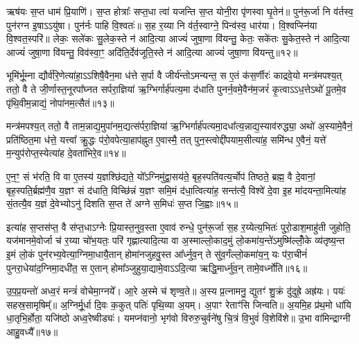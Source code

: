 ऋष॑यः स॒प्त धाम॑ प्रि॒याणि॑। स॒प्त होत्राः᳚ सप्त॒धा त्वा॑ यजन्ति स॒प्त योनी॒रा पृ॑णस्वा घृ॒तेन॑॥ पुन॑रू॒र्जा नि व॑र्तस्व॒ पुन॑रग्न इ॒षा\-ऽ\-ऽयु॑षा। पुन॑र्नः पाहि वि॒श्वतः॑॥ स॒ह र॒य्या नि व॑र्त॒स्वाग्ने॒ पिन्व॑स्व॒ धार॑या। वि॒श्वप्स्नि॑या वि॒श्वत॒स्परि॑॥ लेकः॒ सले॑कः सु॒लेक॒स्ते न॑ आदि॒त्या आज्यं॑ जुषा॒णा वि॑यन्तु॒ केतः॒ सके॑तः सु॒केत॒स्ते न॑ आदि॒त्या आज्यं॑ जुषा॒णा वि॑यन्तु॒ विव॑स्वा॒ꣳ॒ अदि॑ति॒र्देव॑जूति॒स्ते न॑ आदि॒त्या आज्यं॑ जुषा॒णा वि॑यन्तु॥१२॥

{\anuvakamend[{त्वा॒ जि॒ह्वाः स॒प्त सु॒केत॒स्ते न॒स्त्रयो॑दश च॥३॥}]}

भूमि॑र्भू॒म्ना द्यौर्व॑रि॒णेत्या॑हा॒\-ऽ\-ऽशिषै॒वैन॒मा ध॑त्ते स॒र्पा वै जीर्य॑न्तो\-ऽमन्यन्त॒ स ए॒तं क॑स॒र्णीरः॑ काद्रवे॒यो मन्त्र॑मपश्य॒त् ततो॒ वै ते जी॒र्णास्त॒नूरपा᳚घ्नत सर्परा॒ज्ञिया॑ ऋ॒ग्भिर्गार्\mbox{}ह॑पत्य॒मा द॑धाति पुनर्न॒वमे॒वैन॑म॒जरं॑ कृ॒त्वा\-ऽ\-ऽध॒त्ते\-ऽथो॑ पू॒तमे॒व पृ॑थि॒वीम॒न्नाद्यं॒ नोपा॑नम॒त्सैतं॥१३॥

मन्त्र॑मपश्य॒त् ततो॒ वै ताम॒न्नाद्य॒मुपा॑नम॒द्यत्स॑र्परा॒ज्ञिया॑ ऋ॒ग्भिर्गार्\mbox{}ह॑पत्यमा॒दधा᳚त्य॒न्नाद्य॒स्याव॑रुद्ध्या॒ अथो॑ अ॒स्यामे॒वैनं॒ प्रति॑ष्ठित॒मा ध॑त्ते॒ यत्त्वा᳚ क्रु॒द्धः प॑रो॒वपेत्या॒हाप॑ह्नुत ए॒वास्मै॒ तत् पुन॒स्त्वोद्दी॑पयाम॒सीत्या॑ह॒ समि॑न्ध ए॒वैनं॒ यत्ते॑ म॒न्युप॑रोप्त॒स्येत्या॑ह दे॒वता॑भिरे॒व॥१४॥

ए॒न॒ꣳ॒ सं भ॑रति॒ वि वा ए॒तस्य॑ य॒ज्ञश्छि॑द्यते॒ यो᳚\-ऽग्निमु॑द्वा॒सय॑ते॒ बृह॒स्पति॑वत्य॒र्चोप॑ तिष्ठते॒ ब्रह्म॒ वै दे॒वानां॒ बृह॒स्पति॒र्ब्रह्म॑णै॒व य॒ज्ञꣳ सं द॑धाति॒ विच्छि॑न्नं य॒ज्ञꣳ समि॒मं द॑धा॒त्वित्या॑ह॒ सन्त॑त्यै॒ विश्वे॑ दे॒वा इ॒ह मा॑दयन्ता॒मित्या॑ह सं॒तत्यै॒व य॒ज्ञं दे॒वेभ्यो\-ऽनु॑ दिशति स॒प्त ते॑ अग्ने स॒मिधः॑ स॒प्त जि॒ह्वाः॥१५॥

इत्या॑ह स॒प्तस॑प्त॒ वै स॑प्त॒धा\-ऽग्नेः प्रि॒यास्त॒नुव॒स्ता ए॒वाव॑ रुन्धे॒ पुन॑रू॒र्जा स॒ह र॒य्येत्य॒भितः॑ पुरो॒डाश॒माहु॑ती जुहोति॒ यज॑मानमे॒वोर्जा च॑ र॒य्या चो॑भ॒यतः॒ परि॑ गृह्णात्यादि॒त्या वा अ॒स्माल्लो॒काद॒मुं लो॒कमा॑य॒न्ते॑\-ऽमुष्मि॑ल्लोँ॒के व्य॑तृष्य॒न्त इ॒मं लो॒कं पुन॑रभ्य॒वेत्या॒ग्निमा॒धायै॒तान् होमा॑नजुहवु॒स्त आ᳚र्ध्नुव॒न् ते सु॑व॒र्गंल्लो॒कमा॑य॒न्॒ यः प॑रा॒चीनं॑ पुनरा॒धेया॑द॒ग्निमा॒दधी॑त॒ स ए॒तान् होमा᳚ञ्जुहुया॒द्यामे॒वा\-ऽ\-ऽदि॒त्या ऋद्धि॒मार्ध्नु॑व॒न् तामे॒वर्ध्नो॑ति॥१६॥

{\anuvakamend[{ए॒तमे॒व जि॒ह्वा ए॒तान् पञ्च॑विꣳशतिश्च॥४॥}]}

उ॒प॒प्र॒यन्तो॑ अध्व॒रं मन्त्रं॑ वोचेमा॒ग्नये᳚। आ॒रे अ॒स्मे च॑ शृण्व॒ते॥ अ॒स्य प्र॒त्नामनु॒ द्युतꣳ॑ शु॒क्रं दु॑दुह्रे॒ अह्र॑यः। पयः॑ सहस्र॒सामृषिम्᳚॥ अ॒ग्निर्मू॒र्धा दि॒वः क॒कुत् पतिः॑ पृथि॒व्या अ॒यम्। अ॒पाꣳ रेताꣳ॑सि जिन्वति॥ अ॒यमि॒ह प्र॑थ॒मो धा॑यि धा॒तृभि॒र्\mbox{}होता॒ यजि॑ष्ठो अध्व॒रेष्वीड्यः॑। यमप्न॑वानो॒ भृग॑वो विरुरु॒चुर्वने॑षु चि॒त्रं वि॒भुवं॑ वि॒शेवि॑शे॥ उ॒भा वा॑मिन्द्राग्नी आहु॒वध्यै᳚॥१७॥

